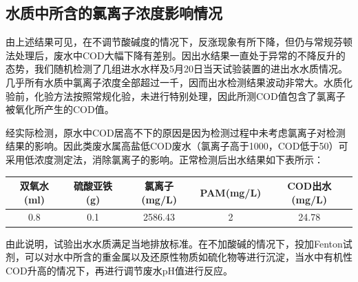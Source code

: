 \subsection{水质中所含的氯离子浓度影响情况}
由上述结果可见，在不调节酸碱度的情况下，反涨现象有所下降，但仍与常规芬顿法处理后，废水中COD大幅下降有差别。因出水结果一直处于异常的不降反升的态势，我们随机检测了几组进水水样及5月20日当天试验装置的进出水水质情况。几乎所有水质中氯离子浓度全部超过一千，因而出水检测结果波动非常大。水质化验前，化验方法按照常规化验，未进行特别处理，因此所测COD值包含了氯离子被氧化所产生的COD值。\par 
经实际检测，原水中COD居高不下的原因是因为检测过程中未考虑氯离子对检测结果的影响。因此类废水属高盐低COD废水（氯离子高于1000，COD低于50）可采用低浓度测定法，消除氯离子的影响。正常检测后出水结果如下表所示：
\begin{center}
\label{tab5}
\begin{tabular}{| c | c | c | c | c |}
    \hline
    双氧水(ml) & 硫酸亚铁(g) & 氯离子(mg/L) & PAM(mg/L) & COD出水(mg/L)\\ \hline 
    0.8 & 0.1 & 2586.43 & 2 & 24.78\\ \hline     
\end{tabular}
\end{center}
\setlength{\parindent}{2em}
\par
由此说明，试验出水水质满足当地排放标准。在不加酸碱的情况下，投加Fenton试剂，可以对水中所含的重金属以及还原性物质如硫化物等进行沉淀，当水中有机性COD升高的情况下，再进行调节废水pH值进行反应。\par